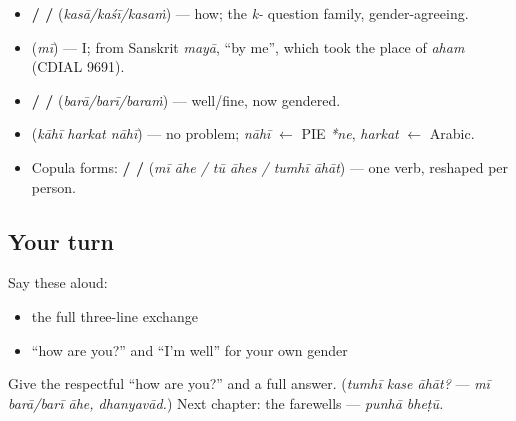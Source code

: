 \begin{grammarlens}[title={What you've built — atoms banked this chapter}]
\begin{itemize}
\raggedright
  \item \textbf{ /  / } (\emph{kasā/kaśī/kasaṁ}) — how; the \emph{k-} question family, gender-agreeing.
  \item \textbf{} (\emph{mī}) — I; from Sanskrit \emph{mayā}, \textquotedblleft{}by me\textquotedblright{}, which took the place of \emph{aham} (CDIAL 9691).
  \item \textbf{ /  / } (\emph{barā/barī/baraṁ}) — well/fine, now gendered.
  \item \textbf{  } (\emph{kāhī harkat nāhī}) — no problem; \emph{nāhī} $\leftarrow$ PIE \emph{*ne}, \emph{harkat} $\leftarrow$ Arabic.
  \item Copula forms: \textbf{  /   /  } (\emph{mī āhe / tū āhes / tumhī āhāt}) — one verb, reshaped per person.
\end{itemize}
\end{grammarlens}

\subsection*{Your turn}
Say these aloud:

\begin{itemize}
\raggedright
  \item the full three-line exchange
  \item \textquotedblleft{}how are you?\textquotedblright{} and \textquotedblleft{}I'm well\textquotedblright{} for your own gender
\end{itemize}

\begin{tcolorbox}[breakable,colback=teal!4,colframe=teal!35!black,title={Before you move on}]
Give the respectful \textquotedblleft{}how are you?\textquotedblright{} and a full answer. (\emph{tumhī kase āhāt?} — \emph{mī barā/barī āhe, dhanyavād.}) Next chapter: the farewells — \emph{punhā bheṭū.}
\end{tcolorbox}
